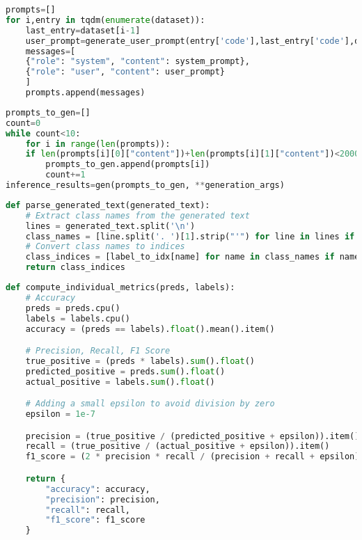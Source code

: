 \begin{latin}
    \begin{lstlisting}[language=Python, title=\rl{تولید پرامپت ها با استفاده از داده ها}]
prompts=[]
for i,entry in tqdm(enumerate(dataset)):
    last_entry=dataset[i-1]
    user_prompt=generate_user_prompt(entry['code'],last_entry['code'],dataset[i-1]["labels"])
    messages=[
    {"role": "system", "content": system_prompt},
    {"role": "user", "content": user_prompt}
    ]
    prompts.append(messages)
\end{lstlisting}
\end{latin}

\begin{latin}
    \begin{lstlisting}[language=Python, title=\rl{ورودی دادن پرامپت ها به پایپلاین تولید متن}]
prompts_to_gen=[]
count=0
while count<10:
    for i in range(len(prompts)):
    if len(prompts[i][0]["content"])+len(prompts[i][1]["content"])<2000:
        prompts_to_gen.append(prompts[i])
        count+=1
inference_results=gen(prompts_to_gen, **generation_args)
\end{lstlisting}
\end{latin}

\begin{latin}
    \begin{lstlisting}[language=Python, title=\rl{تابع تجزیه متن خروجی مدل بصورت آرایه برچسب ها}]
def parse_generated_text(generated_text):
    # Extract class names from the generated text
    lines = generated_text.split('\n')
    class_names = [line.split('. ')[1].strip("'") for line in lines if '. ' in line]
    # Convert class names to indices
    class_indices = [label_to_idx[name] for name in class_names if name in label_to_idx]
    return class_indices
\end{lstlisting}
\end{latin}

\begin{latin}
    \begin{lstlisting}[language=Python, title=\rl{تابع ارزیابی مدل}]
def compute_individual_metrics(preds, labels):
    # Accuracy
    preds = preds.cpu()
    labels = labels.cpu()
    accuracy = (preds == labels).float().mean().item()

    # Precision, Recall, F1 Score
    true_positive = (preds * labels).sum().float()
    predicted_positive = preds.sum().float()
    actual_positive = labels.sum().float()

    # Adding a small epsilon to avoid division by zero
    epsilon = 1e-7

    precision = (true_positive / (predicted_positive + epsilon)).item()
    recall = (true_positive / (actual_positive + epsilon)).item()
    f1_score = (2 * precision * recall / (precision + recall + epsilon))

    return {
        "accuracy": accuracy,
        "precision": precision,
        "recall": recall,
        "f1_score": f1_score
    } 
\end{lstlisting}
\end{latin}

